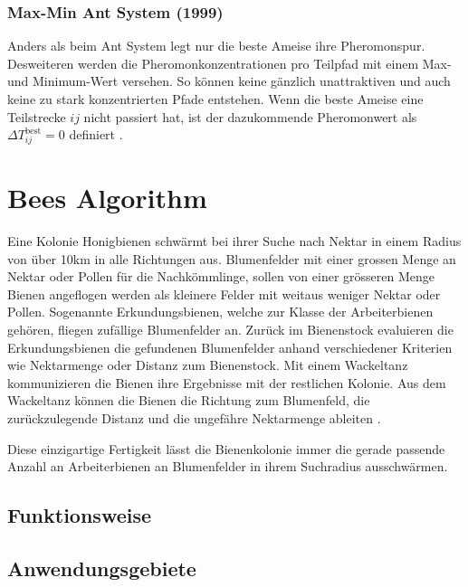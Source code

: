 \subsubsection{Max-Min Ant System (1999)}
Anders als beim Ant System legt nur die beste Ameise ihre Pheromonspur. Desweiteren werden die
Pheromonkonzentrationen pro Teilpfad mit einem Max- und Minimum-Wert versehen. So können keine gänzlich
unattraktiven und auch keine zu stark konzentrierten Pfade entstehen. Wenn die beste Ameise eine Teilstrecke
$ij$ nicht passiert hat, ist der dazukommende Pheromonwert als $\Delta T_{ij}^\text{best} = 0$ definiert
\cite{Dor07}.


\section{Bees Algorithm}
Eine Kolonie Honigbienen schwärmt bei ihrer Suche nach Nektar in einem Radius von über 10km in alle Richtungen
aus. Blumenfelder mit einer grossen Menge an Nektar oder Pollen für die Nachkömmlinge, sollen von einer
grösseren Menge Bienen angeflogen werden als kleinere Felder mit weitaus weniger Nektar oder Pollen. Sogenannte
Erkundungsbienen, welche zur Klasse der Arbeiterbienen gehören, fliegen zufällige Blumenfelder an. Zurück im
Bienenstock evaluieren die Erkundungsbienen die gefundenen Blumenfelder anhand verschiedener Kriterien wie
Nektarmenge oder Distanz zum Bienenstock. Mit einem Wackeltanz kommunizieren die Bienen ihre Ergebnisse mit
der restlichen Kolonie. Aus dem Wackeltanz können die Bienen die Richtung zum Blumenfeld, die zurückzulegende
Distanz und die ungefähre Nektarmenge ableiten \cite{Bro11}.

Diese einzigartige Fertigkeit lässt die Bienenkolonie immer die gerade passende Anzahl an Arbeiterbienen an
Blumenfelder in ihrem Suchradius ausschwärmen.

\subsection{Funktionsweise}

\subsection{Anwendungsgebiete}